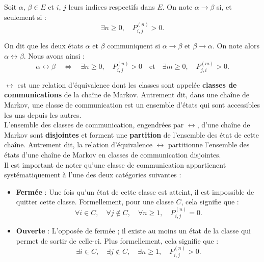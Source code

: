 \documentclass{article}
\begin{document}
Soit $\alpha$, $\beta \in E$ et $i$, $j$ leurs indices respectifs dans $E$. On note $\alpha \rightarrow \beta$ si, et seulement si :
\[
\exists n \geq 0, \quad P_{i,j}^{(n)} > 0.
\]

On dit que les deux états $\alpha$ et $\beta$ communiquent si $\alpha \rightarrow \beta$ et $\beta \rightarrow \alpha$. On note alors $\alpha \leftrightarrow \beta$. Nous avons ainsi :
\[
\alpha \leftrightarrow \beta \quad \iff \quad \exists n \geq 0, \quad P_{i,j}^{(n)} > 0 \quad \text{et} \quad \exists m \geq 0, \quad P_{j,i}^{(m)} > 0.
\]

$\leftrightarrow$ est une relation d'équivalence dont les classes sont appelée \textbf{classes de communications} de la chaîne de Markov. Autrement dit, dans une chaîne de Markov, une classe de communication est un ensemble d'états qui sont accessibles les uns depuis les autres. \\

L'ensemble des classes de communication, engendrées par $\leftrightarrow$, d'une chaîne de Markov sont \textbf{disjointes} et forment une \textbf{partition} de l'ensemble des état de cette chaîne.
Autrement dit, la relation d'équivalence $\leftrightarrow$ partitionne l'ensemble des états d'une chaîne de Markov en classes de communication disjointes. \\ %

Il est important de noter qu'une classe de communication appartienent systématiquement à l'une des deux catégories suivantes :
\begin{itemize}
\item \textbf{Fermée} : Une fois qu'un état de cette classe est atteint, il est impossible de quitter cette classe. Formellement, pour une classe $C$, cela signifie que :
  \[
  \forall i \in C, \quad \forall j \notin C, \quad \forall n \geq 1, \quad P_{i,j}^{(n)} = 0.
  \]
\item \textbf{Ouverte} : L'opposée de fermée ; il existe au moins un état de la classe qui permet de sortir de celle-ci. Plus formellement, cela signifie que :
  \[
  \exists i \in C, \quad \exists j \notin C, \quad \exists n \geq 1, \quad P_{i,j}^{(n)} > 0.
  \]
\end{itemize}

\end{document}
